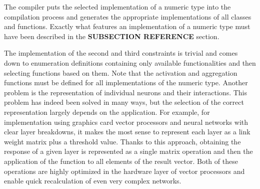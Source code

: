 The compiler puts the selected implementation of a numeric type into the compilation process 
and generates the appropriate implementations of all classes and functions. 
Exactly what features an implementation of a numeric type must have been described in the 
\textbf{SUBSECTION REFERENCE} section.

The implementation of the second and third constraints is trivial and comes down to 
enumeration definitions containing only available functionalities and then selecting functions 
based on them. 
Note that the activation and aggregation functions must be defined for all implementations of 
the numeric type.
Another problem is the representation of individual neurons and their interactions. 
This problem has indeed been solved in many ways, but the selection of the correct representation 
largely depends on the application.
For example, for implementation using graphics card vector processors and neural networks with 
clear layer breakdowns, it makes the most sense to represent each layer as a link weight matrix 
plus a threshold value. 
Thanks to this approach, obtaining the response of a given layer is represented as a single matrix 
operation and then the application of the function to all elements of the result vector. 
Both of these operations are highly optimized in the hardware layer of vector processors and enable 
quick recalculation of even very complex networks.

